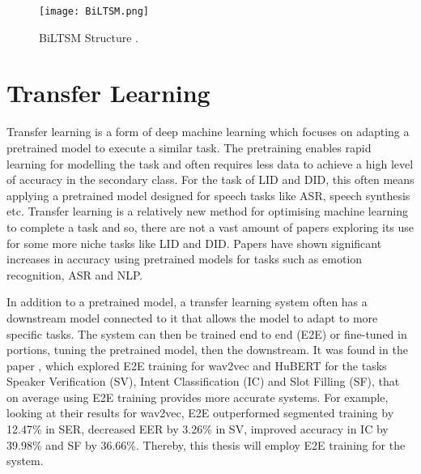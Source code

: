 \begin{figure}[h!]
    \centering
    \texttt{[image: BiLTSM.png]}
    \caption{BiLTSM Structure \cite{cornegruta_modelling_2016}.}
    \label{fig:BiLTSM}
\end{figure}


\section{Transfer Learning}\label{sec:transfer}
Transfer learning is a form of deep machine learning which focuses on adapting a pretrained model to execute a 
similar task. The pretraining enables rapid learning for modelling the task and often requires less data to 
achieve a high level of accuracy in the secondary class. For the task of LID and DID, this often means applying 
a pretrained model designed for speech tasks like ASR, speech synthesis etc. Transfer learning is a relatively new method for optimising 
machine learning to complete a task and so, there are not a vast amount of papers exploring its use for some more niche tasks 
like LID and DID. Papers \cite{hussein_arabic_2021, habash_guidelines_2008, mohamed_arabic_2021, wang_fine-tuned_2021} have shown significant increases in accuracy using pretrained models for tasks 
such as emotion recognition, ASR and NLP. 

In addition to a pretrained model, a transfer learning system often has a downstream model connected to it that allows the model to 
adapt to more specific tasks. The system can then be trained end to end (E2E) or fine-tuned in portions, tuning the pretrained model, then 
the downstream. It was found in the paper \cite{wang_fine-tuned_2021}, which explored E2E training for wav2vec and HuBERT for the tasks Speaker Verification (SV), Intent Classification (IC) and Slot Filling (SF), that on average using E2E training 
provides more accurate systems. For example, looking at their results for wav2vec, E2E outperformed segmented training by 12.47\% in SER, decreased EER by 3.26\% in SV, improved accuracy in IC by 39.98\% and SF by 36.66\%. 
Thereby, this thesis will employ E2E training for the system. 


